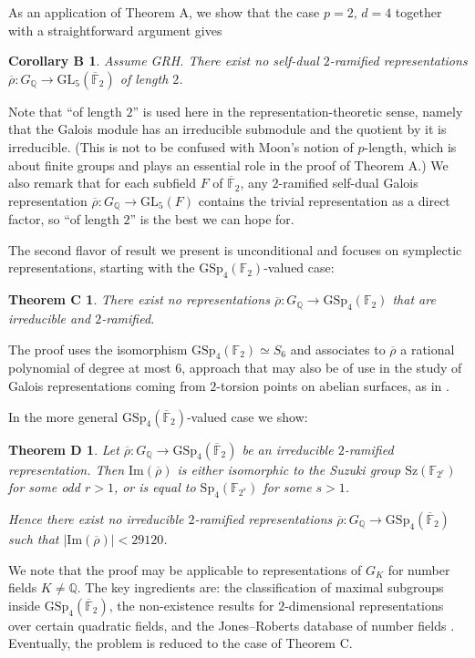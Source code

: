 \documentclass{amsart}
\newtheorem*{corB}{Corollary B}
\newtheorem*{theoremC}{Theorem C}
\newtheorem*{theoremD}{Theorem D}
\theoremstyle{definition}
\newcommand{\lra}{\longrightarrow}
\newcommand{\Q}{\mathbb{Q}}
\newcommand{\F}{\mathbb{F}}
\newcommand{\bF}{\overline{\F}}
\newcommand{\br}{\overline{\rho}}
\newcommand{\GSp}{\mathrm{GSp}}
\newcommand{\Sp}{\mathrm{Sp}}
\newcommand{\GL}{\mathrm{GL}}
\newcommand{\Sz}{\mathrm{Sz}}
\newcommand{\im}{\mathrm{Im}}
\begin{document}
As an application of Theorem A, we show that the case $p=2$, $d=4$ together with a straightforward argument gives
\begin{corB}
  Assume GRH.
  There exist no self-dual $2$-ramified representations $\br:G_\Q\lra \GL_5(\bF_2)$ of length $2$.
\end{corB}
Note that ``of length $2$'' is used here in the representation-theoretic sense, namely that the Galois module has an irreducible submodule and the quotient by it is irreducible.
(This is not to be confused with Moon's notion of $p$-length, which is about finite groups and plays an essential role in the proof of Theorem A.)
We also remark that for each subfield $F$ of $\bF_2$, any $2$-ramified self-dual Galois representation $\br:G_\Q\lra \GL_5(F)$ contains the trivial representation as a direct factor, so ``of length $2$'' is the best we can hope for.

The second flavor of result we present is unconditional and focuses on symplectic representations, starting with the $\GSp_4(\F_2)$-valued case:
\begin{theoremC}
  There exist no representations $\br:G_\Q\lra \GSp_4(\F_2)$ that are irreducible and $2$-ramified.
\end{theoremC}
The proof uses the isomorphism $\GSp_4(\F_2)\simeq S_6$ and associates to $\br$ a rational polynomial of degree at most $6$, approach that may also be of use in the study of Galois representations coming from $2$-torsion points on abelian surfaces, as in \cite{GY}.

In the more general $\GSp_4(\bF_2)$-valued case we show:

\begin{theoremD}
  Let $\br:G_\Q\lra \GSp_4(\bF_2)$ be an irreducible $2$-ramified representation.
  Then $\im(\br)$ is either isomorphic to the Suzuki group $\Sz(\F_{2^r})$ for some odd $r>1$, or is equal to $\Sp_4(\F_{2^s})$ for some $s>1$.

  Hence there exist no irreducible $2$-ramified representations $\br:G_\Q\lra \GSp_4(\bF_2)$ such that $|\im(\br)|<29120$.
\end{theoremD}

We note that the proof may be applicable to representations of $G_K$ for number fields $K\neq\Q$.
The key ingredients are: the classification of maximal subgroups inside $\GSp_4(\bF_2)$, the non-existence results for $2$-dimensional representations over certain quadratic fields, and the Jones--Roberts database of number fields \cite{JR}.
Eventually, the problem is reduced to the case of Theorem C.
\end{document}
